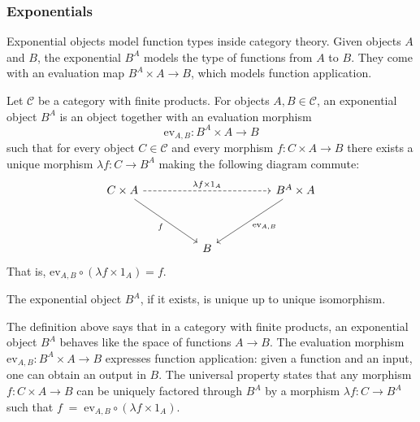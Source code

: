 \subsubsection{\centering Exponentials}

Exponential objects model function types inside category theory. Given objects
$A$ and $B$, the exponential $B^A$ models the type of functions from $A$ to $B$.
They come with an evaluation map $B^A \times A \to B$, which models function
application.

\begin{definition} Let $\mathcal{C}$ be a category with finite products. For objects $A, B \in \mathcal{C}$, an exponential object $B^{A}$ is an object together with an evaluation morphism
\[
  \mathrm{ev}_{A,B} : B^{A} \times A \longrightarrow B
\]
such that for every object $C \in \mathcal{C}$ and every morphism
\(
  f : C \times A \longrightarrow B
\)
there exists a unique morphism
\(
  \lambda f : C \longrightarrow B^{A}
\)
making the following diagram commute:
\[
  \begin{tikzcd}[row sep=huge, column sep=huge]
C \times A \ar[rr, dashed, "\lambda f \times 1_A"] \ar[dr, "f"'] & & B^{A} \times A \ar[dl, "\mathrm{ev}_{A,B}"] \\
& B &
\end{tikzcd}
\]
That is,
\(
  \mathrm{ev}_{A,B} \circ (\lambda f \times 1_A) = f.
\)
\end{definition}

\begin{proposition}
The exponential object $B^{A}$, if it exists, is unique up to unique isomorphism.
\end{proposition}

The definition above says that in a category with finite products, an exponential
object $B^{A}$ behaves like the space of functions $A \to B$.
The evaluation morphism
\(
  \mathrm{ev}_{A,B} : B^{A} \times A \longrightarrow B
\)
expresses function application: given a function and an input, one can obtain an
output in $B$.
The universal property states that any morphism
\(
  f : C \times A \longrightarrow B
\)
can be uniquely factored through $B^{A}$ by a morphism
\(
  \lambda f : C \longrightarrow B^{A}
\)
such that
\(
  f \;=\; \mathrm{ev}_{A,B} \circ (\lambda f \times 1_A).
  \)

